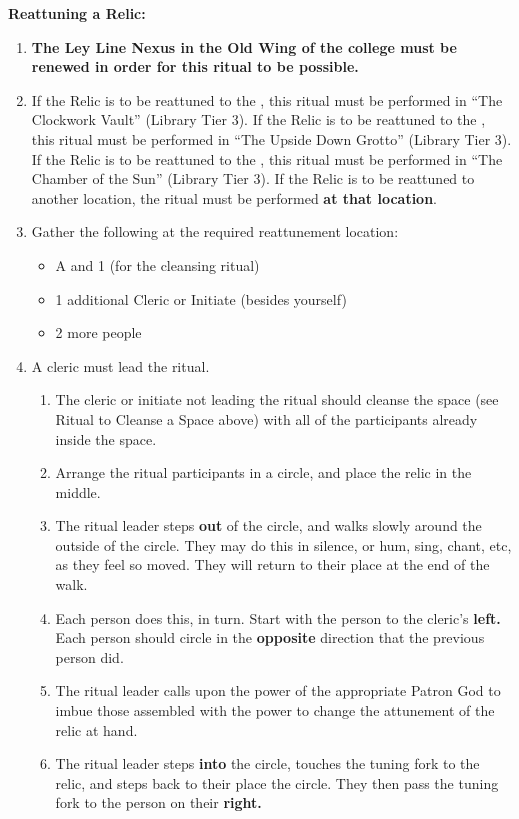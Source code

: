 \documentclass[green]{GL2020}
\begin{document}
\textbf{Reattuning a Relic:}
  \begin{enumerate}
    \item \textbf{The Ley Line Nexus in the Old Wing of the college must be renewed in order for this ritual to be possible.}
    \item If the Relic is to be reattuned to the \pTech{}, this ritual must be performed in “The Clockwork Vault” (Library Tier 3). If the Relic is to be reattuned to the \pShip{}, this ritual must be performed in “The Upside Down Grotto” (Library Tier 3). If the Relic is to be reattuned to the \pFarm{}, this ritual must be performed in “The Chamber of the Sun” (Library Tier 3). If the Relic is to be reattuned to another location, the ritual must be performed \textbf{at that location}.
    \item Gather the following at the required reattunement location:
    \begin{itemize}
      \item A \iTuningFork{} and 1 \iRitualCandle{} (for the cleansing ritual)
      \item 1 additional Cleric or Initiate (besides yourself)
      \item 2 more people
    \end{itemize}
    \item A cleric must lead the ritual.
    \begin{enumerate}
      \item The cleric or initiate not leading the ritual should cleanse the space (see Ritual to Cleanse a Space above) with all of the participants already inside the space.
      \item Arrange the ritual participants in a circle, and place the relic in the middle.
      \item The ritual leader steps \textbf{out} of the circle, and walks slowly around the outside of the circle. They may do this in silence, or hum, sing, chant, etc, as they feel so moved. They will return to their place at the end of the walk.
      \item Each person does this, in turn. Start with the person to the cleric’s \textbf{left.} Each person should circle in the \textbf{opposite} direction that the previous person did.
      \item The ritual leader calls upon the power of the appropriate Patron God to imbue those assembled with the power to change the attunement of the relic at hand.
      \item The ritual leader steps \textbf{into} the circle, touches the tuning fork to the relic, and steps back to their place the circle. They then pass the tuning fork to the person on their \textbf{right.}

\end{enumerate}
\end{enumerate}
\end{document}
